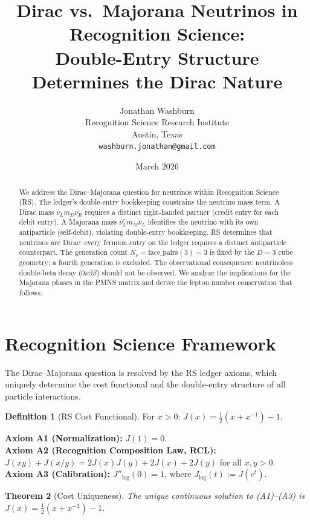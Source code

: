 \documentclass[12pt,a4paper]{article}
\title{Dirac vs.\ Majorana Neutrinos in Recognition Science:\\
Double-Entry Structure Determines the Dirac Nature}
\author{Jonathan Washburn\\
Recognition Science Research Institute\\
Austin, Texas\\
\texttt{washburn.jonathan@gmail.com}}
\date{March 2026}
\newtheorem{theorem}{Theorem}[section]
\theoremstyle{definition}
\newtheorem{definition}[theorem]{Definition}
\theoremstyle{remark}
\begin{document}
\maketitle

\begin{abstract}
We address the Dirac--Majorana question for neutrinos within
Recognition Science (RS).  The ledger's double-entry bookkeeping
constrains the neutrino mass term.  A Dirac mass
$\bar{\nu}_L m_D \nu_R$ requires a distinct right-handed partner
(credit entry for each debit entry).  A Majorana mass
$\bar{\nu}_L^c m_M \nu_L$ identifies the neutrino with its own
antiparticle (self-debit), violating double-entry bookkeeping.
RS determines that neutrinos are Dirac: every fermion entry on the
ledger requires a distinct antiparticle counterpart.  The
generation count $N_\nu = \mathrm{face\_pairs}(3) = 3$ is fixed
by the $D = 3$ cube geometry; a fourth generation is excluded.
The observational consequence: neutrinoless double-beta decay
($0\nu\beta\beta$) should not be observed.  We analyze the
implications for the Majorana phases in the PMNS matrix and
derive the lepton number conservation that follows.
\end{abstract}

\section{Recognition Science Framework}
\label{sec:framework}

The Dirac--Majorana question is resolved by the RS ledger axioms,
which uniquely determine the cost functional and the double-entry
structure of all particle interactions.

\begin{definition}[RS Cost Functional]
For $x > 0$: $J(x) = \tfrac{1}{2}(x + x^{-1}) - 1$.
\end{definition}

\noindent\textbf{Axiom A1 (Normalization):} $J(1) = 0$.\\
\textbf{Axiom A2 (Recognition Composition Law, RCL):}
$J(xy)+J(x/y)=2J(x)J(y)+2J(x)+2J(y)$ for all $x,y>0$.\\
\textbf{Axiom A3 (Calibration):} $J''_{\log}(0) = 1$, where
$J_{\log}(t) := J(e^t)$.

\begin{theorem}[Cost Uniqueness]
\label{thm:unique}
The unique continuous solution to \textup{(A1)--(A3)} is
$J(x) = \tfrac{1}{2}(x + x^{-1}) - 1$.
\end{theorem}
\end{document}
